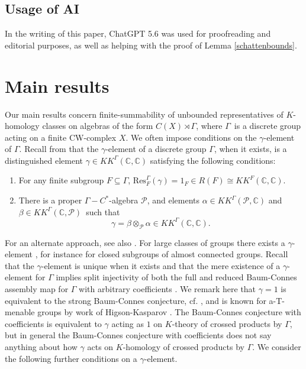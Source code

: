 \documentclass[a4paper,reqno]{amsart}
\numberwithin{equation}{section}
\def\C{\mathbb{C}}
\theoremstyle{definition}
\theoremstyle{remark}
\begin{document}
\subsection*{Usage of AI} 

In the writing of this paper, ChatGPT 5.6 was used for proofreading and editorial purposes, as well as helping with the proof of Lemma \ref{schattenbounds}.


\section{Main results}
\label{subsecintro}


Our main results concern finite-summability of unbounded representatives of $K$-homology classes on algebras of the form $C(X)\rtimes \Gamma$, where $\Gamma$ is a discrete group acting on a finite CW-complex $X$. We often impose conditions on the $\gamma$-element of $\Gamma$. Recall from \cite{tu00} that the $\gamma$-element of a discrete group $\Gamma$, when it exists, is a distinguished element $\gamma\in KK^\Gamma(\C,\C)$ satisfying the following conditions:
\begin{enumerate}
\item[A.] For any finite subgroup $F\subseteq \Gamma$, $\mathrm{Res}^\Gamma_F(\gamma)=1_F\in R(F)\cong KK^F(\C,\C)$.
\item[B.] There is a proper $\Gamma-C^*$-algebra $\mathcal{P}$, and elements $\alpha\in KK^\Gamma(\mathcal{P},\C)$ and $\beta\in KK^\Gamma(\C,\mathcal{P})$ such that 
$$\gamma=\beta\otimes_\mathcal{P} \alpha\in KK^\Gamma(\C,\C).$$
\end{enumerate}
For an alternate approach, see also \cite{nishisplit}. For large classes of groups there exists a $\gamma$-element \cite{kaspinv}, for instance for closed subgroups of almost connected groups. Recall that the $\gamma$-element is unique when it exists and that the mere existence of a $\gamma$-element for $\Gamma$ implies split injectivity of both the full and reduced Baum-Connes assembly map for $\Gamma$ with arbitrary coefficients \cite{tu00}. We remark here that $\gamma=1$ is equivalent to the strong Baum-Connes conjecture, cf. \cite{meyernest}, and is known for a-T-menable groups by work of Higson-Kasparov \cite{higsonkasp}. The Baum-Connes conjecture with coefficients is equivalent to $\gamma$ acting as $1$ on $K$-theory of crossed products by $\Gamma$, but in general the Baum-Connes conjecture with coefficients does not say anything about how $\gamma$ acts on $K$-homology of crossed products by $\Gamma$. We consider the following further conditions on a $\gamma$-element.
\end{document}
